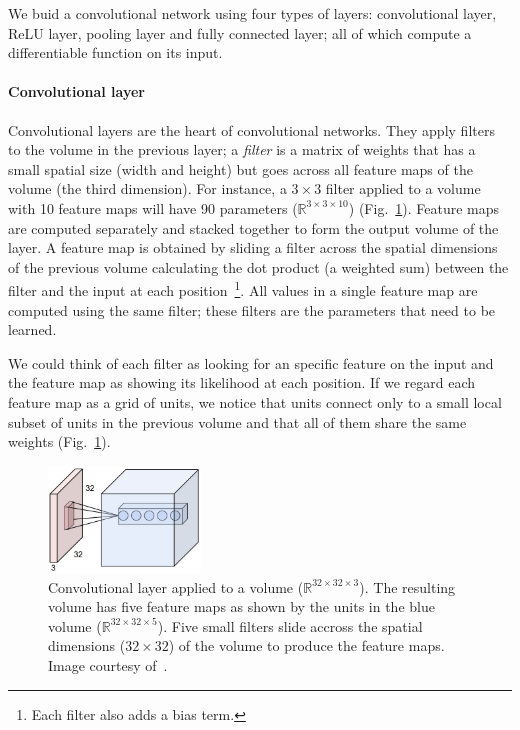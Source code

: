 We buid a convolutional network using four types of layers: convolutional layer, ReLU layer, pooling layer and fully connected layer; all of which compute a differentiable function on its input.

\paragraph{Convolutional layer} Convolutional layers are the heart of convolutional networks. They apply filters to the volume in the previous layer; a \emph{filter} is a matrix of weights that has a small spatial size (width and height) but goes across all feature maps of the volume (the third dimension). For instance, a $3\times 3$ filter applied to a volume with 10 feature maps will have 90 parameters ($\mathbb{R}^{3\times3\times10}$) (Fig.~\ref{fig:ConvLayer}).
Feature maps are computed separately and stacked together to form the output volume of the layer. A feature map is obtained by sliding a filter across the spatial dimensions of the previous volume calculating the dot product (a weighted sum) between the filter and the input at each position~\footnote{Each filter also adds a bias term.}.
All values in a single feature map are computed using the same filter; these filters are the parameters that need to be learned.

We could think of each filter as looking for an specific feature on the input and the feature map as showing its likelihood at each position. If we regard each feature map as a grid of units, we notice that units connect only to a small local subset of units in the previous volume and that all of them share the same weights (Fig.~\ref{fig:ConvLayer}).
\begin{figure}[h]
	\centering
	\includegraphics[width = 0.36\textwidth]{plots/convLayer.jpeg}
	\caption[Convolutional layer applied to a volume]{Convolutional layer applied to a volume ($\mathbb{R}^{32\times 32\times 3}$). The resulting volume has five feature maps as shown by the units in the blue volume ($\mathbb{R}^{32\times 32\times 5}$). Five small filters slide accross the spatial dimensions ($32\times 32$) of the volume to produce the feature maps. Image courtesy of~\cite{Karpathy2016}.}
	\label{fig:ConvLayer}
\end{figure}

